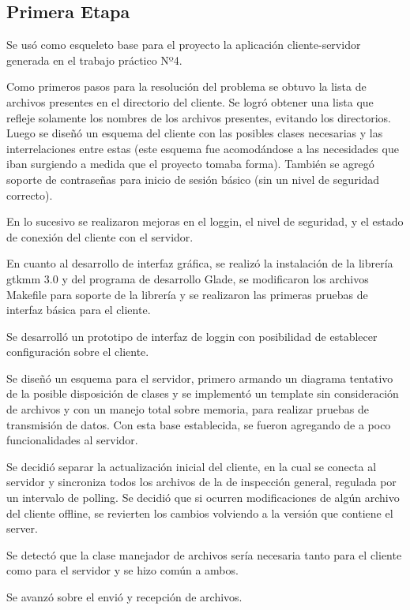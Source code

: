 \documentclass{article}
\begin{document}
\subsection{Primera Etapa}
\smallskip
	Se usó como esqueleto base para el proyecto la aplicación cliente-servidor generada en el trabajo práctico Nº4.
	\par
	Como primeros pasos para la resolución del problema se obtuvo la lista de archivos presentes en el directorio del cliente. Se logró obtener una lista que refleje solamente los nombres de los archivos presentes, evitando los directorios. Luego se diseñó un esquema del cliente con las posibles clases necesarias y las interrelaciones entre estas (este esquema fue acomodándose a las necesidades que iban surgiendo a medida que el proyecto tomaba forma). También se agregó soporte de contraseñas para inicio de sesión básico (sin un nivel de seguridad correcto).
	\par
	En lo sucesivo se realizaron mejoras en el loggin, el nivel de seguridad, y el estado de conexión del cliente con el servidor.
	\par
	En cuanto al desarrollo de interfaz gráfica, se realizó la instalación de la librería gtkmm 3.0 y del programa de desarrollo Glade, se modificaron los archivos Makefile para soporte de la librería y se realizaron las primeras pruebas de interfaz básica para el cliente.
	\par
	Se desarrolló un prototipo de interfaz de loggin con posibilidad de establecer configuración sobre el cliente.
	\par
	Se diseñó un esquema para el servidor, primero armando un diagrama tentativo de la posible disposición de clases y se implementó un template sin consideración de archivos y con un manejo total sobre memoria, para realizar pruebas de transmisión de datos. Con esta base establecida, se fueron agregando de a poco funcionalidades al servidor. 

	Se decidió separar la actualización inicial del cliente, en la cual se conecta al servidor y sincroniza todos los archivos de la de inspección general, regulada por un intervalo de polling. Se decidió que si ocurren modificaciones de algún archivo del cliente offline, se revierten los cambios volviendo a la versión que contiene el server.
	\par
	Se detectó que la clase manejador de archivos sería necesaria tanto para el cliente como para el servidor y se hizo común a ambos.
	\par
	Se avanzó sobre el envió y recepción de archivos.
\end{document}
